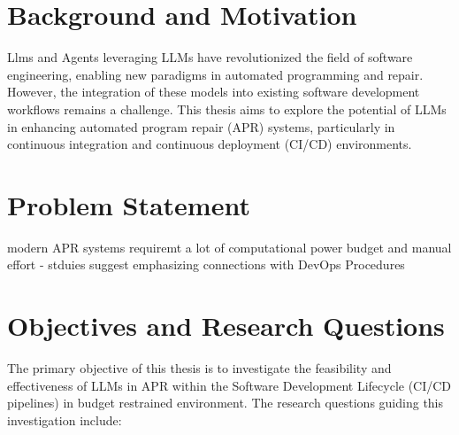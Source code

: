 \section{Background and Motivation}
Llms and Agents leveraging LLMs have revolutionized the field of software engineering, enabling new paradigms in automated programming and repair. However, the integration of these models into existing software development workflows remains a challenge. This thesis aims to explore the potential of LLMs in enhancing automated program repair (APR) systems, particularly in continuous integration and continuous deployment (CI/CD) environments.
\section{Problem Statement}
modern APR systems requiremt a lot of computational power budget and manual effort - stduies suggest emphasizing connections with DevOps Procedures \cite{puvvadiCodingAgentsComprehensive2025}

\section{Objectives and Research Questions}
The primary objective of this thesis is to investigate the feasibility and effectiveness of LLMs in APR within the Software Development Lifecycle (CI/CD pipelines) in budget restrained environment. The research questions guiding this investigation include:
